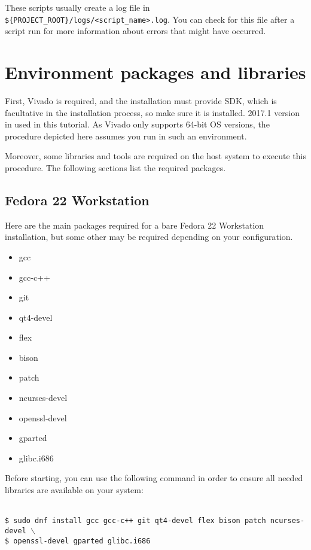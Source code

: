 \documentclass[openany,a4paper]{book}
\begin{document}
These scripts usually create a log file in \nolinkurl{${PROJECT_ROOT}/logs/<script_name>.log}.
You can check for this file after a script run for more information about errors that might have occurred.


\section{Environment packages and libraries}

First, Vivado is required, and the installation must provide SDK, which is facultative in the installation process, so make sure it is installed.
2017.1 version in used in this tutorial.
As Vivado only supports 64-bit OS versions, the procedure depicted here assumes you run in such an environment.

Moreover, some libraries and tools are required on the host system to execute this procedure.
The following sections list the required packages.

\subsection{Fedora 22 Workstation}

Here are the main packages required for a bare Fedora 22 Workstation installation, but some other may be required depending on your configuration.

\begin{itemize}
\setlength\parskip{0pt}
\item gcc
\item gcc-c++
\item git
\item qt4-devel
\item flex
\item bison
\item patch
\item ncurses-devel
\item openssl-devel
\item gparted
\item glibc.i686
\end{itemize}

Before starting, you can use the following command in order to ensure all needed libraries are available on your system:

\begin{tabbing}
\kill \hspace{1cm} \= \\
\> \texttt{\$ sudo dnf install gcc gcc-c++ git qt4-devel flex bison patch ncurses-devel $\backslash$} \\
\> \texttt{\$ openssl-devel gparted glibc.i686} \\
\end{tabbing}
\end{document}
